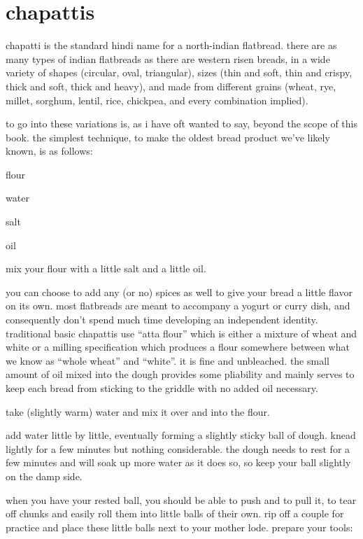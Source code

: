 \section{chapattis}

chapatti is the standard hindi name for a north-indian flatbread. there are as 
many types of indian flatbreads as there are western risen breads, in a wide 
variety of shapes (circular, oval, triangular), sizes (thin and soft, thin and 
crispy, thick and soft, thick and heavy), and made from different grains 
(wheat, rye, millet, sorghum, lentil, rice, chickpea, and every combination 
implied).

to go into these variations is, as i have oft wanted to say, beyond the scope 
of this book. the simplest technique, to make the oldest bread product we've 
likely known, is as follows:

\begin{ingredients}
  \item flour
  \item water
  \item salt
  \item oil
\end{ingredients}

mix your flour with a little salt and a little oil.

you can choose to add any (or no) spices as well to give your bread a little 
flavor on its own. most flatbreads are meant to accompany a yogurt or curry 
dish, and consequently don't spend much time developing an independent 
identity. traditional basic chapattis use ``atta flour'' which is either a 
mixture of wheat and white or a milling specification which produces a flour 
somewhere between what we know as ``whole wheat'' and ``white''. it is fine and 
unbleached. the small amount of oil mixed into the dough provides some 
pliability and mainly serves to keep each bread from sticking to the griddle 
with no added oil necessary.

take (slightly warm) water and mix it over and into the flour.

add water little by little, eventually forming a slightly sticky ball of dough. 
knead lightly for a few minutes but nothing considerable. the dough needs to 
rest for a few minutes and will soak up more water as it does so, so keep your 
ball slightly on the damp side.

when you have your rested ball, you should be able to push and to pull it, to 
tear off chunks and easily roll them into little balls of their own. rip off a 
couple for practice and place these little balls next to your mother lode. 
prepare your tools:

